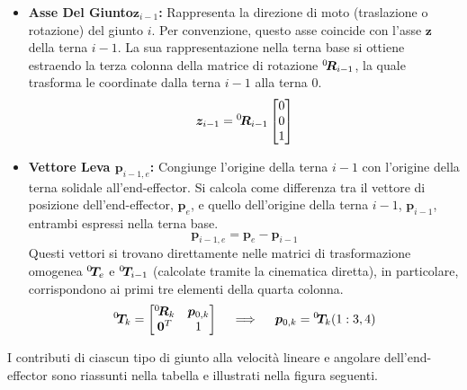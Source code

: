 ﻿\documentclass[11pt, a4paper]{article}
\begin{document}
\begin{itemize}
    \item \textbf{Asse Del Giunto\(\bm{z}_{i-1}\):} Rappresenta la direzione di moto (traslazione o rotazione) del giunto \(i\). Per convenzione, questo asse coincide con l'asse \(\bm{z}\) della terna \(i-1\). La sua rappresentazione nella terna base si ottiene estraendo la terza colonna della matrice di rotazione \(\vphantom{\bm{R}}^{0}_{}\!{\bm{R}}_{i-1}\), la quale trasforma le coordinate dalla terna \(i-1\) alla terna 0.
    \[
        \bm{z}_{i-1} = \vphantom{\bm{R}}^{0}_{}\!{\bm{R}}_{i-1}
        \begin{bmatrix} 0 \\ 0 \\ 1 \end{bmatrix}
    \]

    \item \textbf{Vettore Leva \(\bm{p}_{i-1,e}\):} Congiunge l'origine della terna \(i-1\) con l'origine della terna solidale all'end-effector. Si calcola come differenza tra il vettore di posizione dell'end-effector, \(\bm{p}_e\), e quello dell'origine della terna \(i-1\), \(\bm{p}_{i-1}\), entrambi espressi nella terna base.
    \[
        \bm{p}_{i-1,e} = \bm{p}_e - \bm{p}_{i-1}
    \]
    Questi vettori si trovano direttamente nelle matrici di trasformazione omogenea \(\vphantom{\bm{T}}^{0}_{}\!{\bm{T}}_e\) e \(\vphantom{\bm{T}}^{0}_{}\!{\bm{T}}_{i-1}\) (calcolate tramite la cinematica diretta), in particolare, corrispondono ai primi tre elementi della quarta colonna.
    \[
        \vphantom{\bm{T}}^{0}_{}\!{\bm{T}}_{k} = \begin{bmatrix}
            \vphantom{\bm{R}}^{0}_{}\!{\bm{R}}_{k} & \bm{p}_{0,k} \\
            \bm{0}^T & 1
        \end{bmatrix} \quad \implies \quad \bm{p}_{0,k} = \vphantom{\bm{T}}^{0}_{}\!{\bm{T}}_{k}(1:3, 4)
    \]
\end{itemize}

I contributi di ciascun tipo di giunto alla velocità lineare e angolare dell'end-effector sono riassunti nella tabella e illustrati nella figura seguenti.
\end{document}
